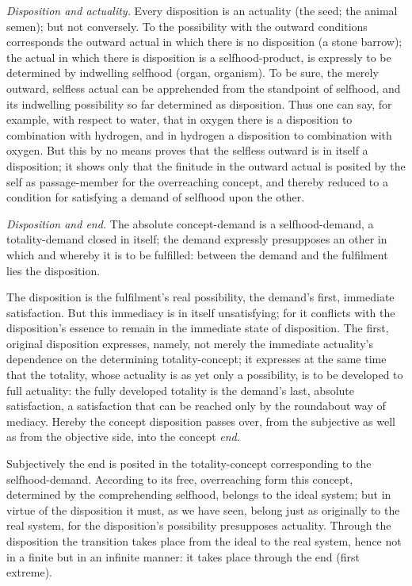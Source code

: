 \documentclass[12pt]{book}
\begin{document}
\emph{Disposition and actuality.} Every disposition is an actuality
(the seed; the animal semen); but not conversely. To the possibility
with the outward conditions corresponds the outward actual in which
there is no disposition (a stone barrow); the actual in which there
is disposition is a selfhood-product, is expressly to be determined
by indwelling selfhood (organ, organism). To be sure, the merely
outward, selfless actual can be apprehended from the standpoint of
selfhood, and its indwelling possibility so far determined as
disposition. Thus one can say, for example, with respect to water,
that in oxygen there is a disposition to combination with hydrogen,
and in hydrogen a disposition to combination with oxygen. But this
by no means proves that the selfless outward is in itself a
disposition; it shows only that the finitude in the outward actual
is posited by the self as passage-member for the overreaching
concept, and thereby reduced to a condition for satisfying a demand
of selfhood upon the other.

\emph{Disposition and end.} The absolute concept-demand is a
selfhood-demand, a totality-demand closed in itself; the demand
expressly presupposes an other in which and whereby it is to be
fulfilled: between the demand and the fulfilment lies the
disposition.

The disposition is the fulfilment's real possibility, the demand's
first, immediate satisfaction. But this immediacy
is in itself unsatisfying; for it conflicts with the disposition's
essence to remain in the immediate state of disposition. The first,
original disposition expresses, namely, not merely the immediate
actuality's dependence on the determining totality-concept; it
expresses at the same time that the totality, whose actuality is as
yet only a possibility, is to be developed to full actuality: the
fully developed totality is the demand's last, absolute
satisfaction, a satisfaction that can be reached only by the
roundabout way of mediacy. Hereby the concept disposition passes
over, from the subjective as well as from the objective side, into
the concept \emph{end}.

Subjectively the end is posited in the totality-concept
corresponding to the selfhood-demand. According to its free,
overreaching form this concept, determined by the comprehending
selfhood, belongs to the ideal system; but in virtue of the
disposition it must, as we have seen, belong just as originally to
the real system, for the disposition's possibility presupposes
actuality. Through the disposition the transition takes place from
the ideal to the real system, hence not in a finite but in an
infinite manner: it takes place through the end (first extreme).
\end{document}
